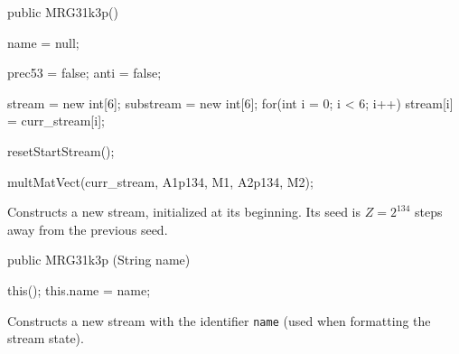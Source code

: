 \begin{code}

   public MRG31k3p() \begin{hide} {
      name = null;

      prec53 = false;
      anti = false;

      stream = new int[6];
      substream = new int[6];
      for(int i = 0; i < 6; i++)
         stream[i] = curr_stream[i];

      resetStartStream();

      multMatVect(curr_stream, A1p134, M1, A2p134, M2);
   }\end{hide}
\end{code}
\begin{tabb} Constructs a new stream, initialized at its beginning.
  Its seed is $Z = 2^{134}$ steps away from the previous seed.
\end{tabb}
\begin{code}

   public MRG31k3p (String name)  \begin{hide} {
      this();
      this.name = name;
   }\end{hide}
\end{code}
\begin{tabb}  Constructs a new stream with the identifier \texttt{name}
  (used when formatting the stream state).
\end{tabb}
\begin{htmlonly}
\end{htmlonly}


